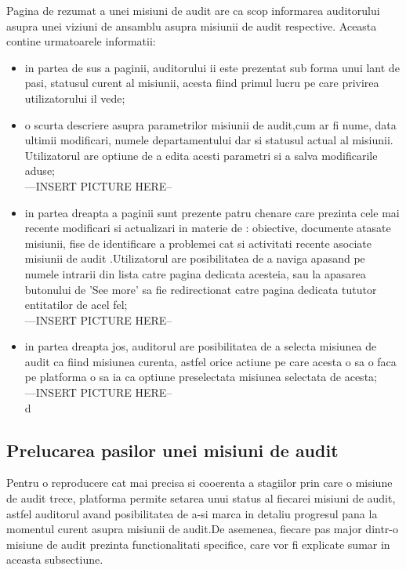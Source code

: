 Pagina de rezumat a unei misiuni de audit are ca scop informarea auditorului asupra unei viziuni de ansamblu asupra misiunii de audit respective. Aceasta contine urmatoarele informatii:\\
\begin{itemize}
	
	\item in partea de sus a paginii, auditorului ii este prezentat sub forma unui lant de pasi, statusul curent al misiunii, acesta fiind primul lucru pe care privirea utilizatorului il vede;
	
	\item o scurta descriere asupra parametrilor misiunii de audit,cum ar fi nume, data ultimii modificari, numele departamentului dar si statusul actual al misiunii. Utilizatorul are optiune de a edita acesti parametri si a salva modificarile aduse;\\
	---INSERT PICTURE HERE-- \\
	
	\item in partea dreapta a paginii sunt prezente patru chenare care prezinta cele mai recente modificari si actualizari in materie de : obiective, documente atasate misiunii, fise de identificare a problemei cat si activitati recente asociate misiunii de audit  .Utilizatorul are posibilitatea de a naviga apasand pe numele intrarii din lista catre pagina dedicata acesteia, sau la apasarea butonului de 'See more' sa fie redirectionat catre pagina dedicata tututor entitatilor de acel fel;\\
---INSERT PICTURE HERE-- \\
	\item in partea dreapta jos, auditorul are posibilitatea de a selecta misiunea de audit ca fiind misiunea curenta, astfel orice actiune pe care acesta o sa o faca pe platforma o sa ia ca optiune preselectata misiunea selectata de acesta;\\
	---INSERT PICTURE HERE-- \\
	d
	
	
\end{itemize}


\subsection{Prelucarea pasilor unei misiuni de audit}

Pentru o reproducere cat mai precisa si cooerenta a stagiilor prin care o misiune de audit trece, platforma permite setarea unui status al fiecarei misiuni de audit, astfel auditorul avand posibilitatea de a-si marca in detaliu progresul pana la momentul curent asupra misiunii de audit.De asemenea, fiecare pas major dintr-o misiune de audit prezinta functionalitati specifice, care vor fi explicate sumar in aceasta subsectiune.
